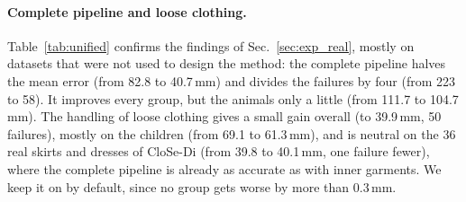 \documentclass[11pt]{article}
\begin{document}
\paragraph{Complete pipeline and loose clothing.} Table~\ref{tab:unified}
confirms the findings of Sec.~\ref{sec:exp_real}, mostly on datasets that
were not used to design the method: the complete pipeline halves the mean
error (from 82.8 to 40.7\,mm) and divides the failures by four (from 223 to
58). It improves every group, but the animals only a little (from 111.7 to
104.7\,mm). The handling of loose clothing gives a small gain overall (to
39.9\,mm, 50 failures), mostly on the children (from 69.1 to 61.3\,mm), and
is neutral on the 36 real skirts and dresses of CloSe-Di (from 39.8 to
40.1\,mm, one failure fewer), where the complete pipeline is already as
accurate as with inner garments. We keep it on by default, since no group
gets worse by more than 0.3\,mm.
\end{document}
